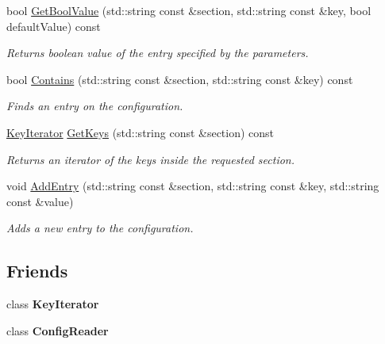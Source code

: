 \begin{DoxyCompactItemize}
bool \hyperlink{class_common_1_1_config_aa802d8ef647dedec6261c330675b494b}{Get\-Bool\-Value} (std\-::string const \&section, std\-::string const \&key, bool default\-Value) const 
\begin{DoxyCompactList}\small\item\em Returns boolean value of the entry specified by the parameters. \end{DoxyCompactList}\item 
bool \hyperlink{class_common_1_1_config_a2db2d7a710a2da3c11f8f5e20267a9f5}{Contains} (std\-::string const \&section, std\-::string const \&key) const 
\begin{DoxyCompactList}\small\item\em Finds an entry on the configuration. \end{DoxyCompactList}\item 
\hyperlink{class_common_1_1_config_1_1_key_iterator}{Key\-Iterator} \hyperlink{class_common_1_1_config_a8c6a1b318de9e28f310763d2313bd69f}{Get\-Keys} (std\-::string const \&section) const 
\begin{DoxyCompactList}\small\item\em Returns an iterator of the keys inside the requested section. \end{DoxyCompactList}\item 
void \hyperlink{class_common_1_1_config_a503736d04428c150b1b1610612615d48}{Add\-Entry} (std\-::string const \&section, std\-::string const \&key, std\-::string const \&value)
\begin{DoxyCompactList}\small\item\em Adds a new entry to the configuration. \end{DoxyCompactList}\end{DoxyCompactItemize}
\subsection*{Friends}
\begin{DoxyCompactItemize}
\item 
\hypertarget{class_common_1_1_config_a4e34a259365f6965a16ab8b276d358d0}{class {\bfseries Key\-Iterator}}\label{class_common_1_1_config_a4e34a259365f6965a16ab8b276d358d0}

\item 
\hypertarget{class_common_1_1_config_ada75ae56b35b5bf88aca48da1012be67}{class {\bfseries Config\-Reader}}\label{class_common_1_1_config_ada75ae56b35b5bf88aca48da1012be67}

\end{DoxyCompactItemize}


